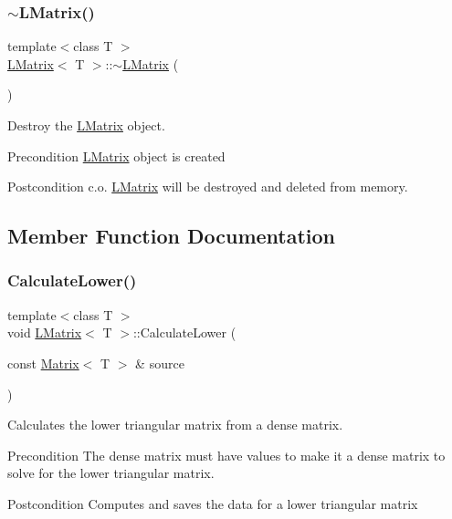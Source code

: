 \subsubsection{\texorpdfstring{$\sim$LMatrix()}{~LMatrix()}}
{\footnotesize\ttfamily template$<$class T $>$ \\
\mbox{\hyperlink{class_l_matrix}{L\+Matrix}}$<$ T $>$\+::$\sim$\mbox{\hyperlink{class_l_matrix}{L\+Matrix}} (\begin{DoxyParamCaption}{ }\end{DoxyParamCaption})}



Destroy the \mbox{\hyperlink{class_l_matrix}{L\+Matrix}} object. 

\begin{DoxyPrecond}{Precondition}
\mbox{\hyperlink{class_l_matrix}{L\+Matrix}} object is created 
\end{DoxyPrecond}
\begin{DoxyPostcond}{Postcondition}
c.\+o. \mbox{\hyperlink{class_l_matrix}{L\+Matrix}} will be destroyed and deleted from memory. 
\end{DoxyPostcond}


\subsection{Member Function Documentation}
\mbox{\label{class_l_matrix_a9a70080e771867dd76c983fe1f8c2c15}} 
\subsubsection{\texorpdfstring{CalculateLower()}{CalculateLower()}}
{\footnotesize\ttfamily template$<$class T $>$ \\
void \mbox{\hyperlink{class_l_matrix}{L\+Matrix}}$<$ T $>$\+::Calculate\+Lower (\begin{DoxyParamCaption}\item[{const \mbox{\hyperlink{class_matrix}{Matrix}}$<$ T $>$ \&}]{source }\end{DoxyParamCaption})}



Calculates the lower triangular matrix from a dense matrix. 

\begin{DoxyPrecond}{Precondition}
The dense matrix must have values to make it a dense matrix to solve for the lower triangular matrix. 
\end{DoxyPrecond}
\begin{DoxyPostcond}{Postcondition}
Computes and saves the data for a lower triangular matrix
\end{DoxyPostcond}

